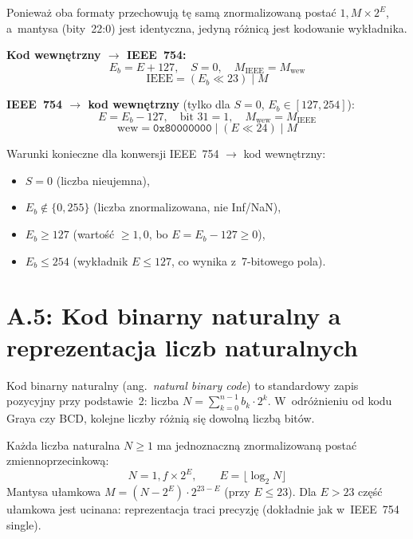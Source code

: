 \documentclass[12pt,a4paper]{article}
\begin{document}
Ponieważ oba formaty przechowują tę samą znormalizowaną postać $1{,}M \times 2^E$,
a~mantysa (bity~22:0) jest identyczna, jedyną różnicą jest kodowanie wykładnika.

\medskip
\noindent\textbf{Kod wewnętrzny $\to$ IEEE~754:}
\[
  E_b = E + 127, \quad S = 0, \quad M_{\text{IEEE}} = M_{\text{wew}}
\]
\[
  \text{IEEE} = (E_b \ll 23) \mid M
\]

\noindent\textbf{IEEE~754 $\to$ kod wewnętrzny} (tylko dla $S=0$, $E_b \in [127, 254]$):
\[
  E = E_b - 127, \quad \text{bit~31} = 1, \quad M_{\text{wew}} = M_{\text{IEEE}}
\]
\[
  \text{wew} = \texttt{0x80000000} \mid (E \ll 24) \mid M
\]

Warunki konieczne dla konwersji IEEE~754 $\to$ kod wewnętrzny:
\begin{itemize}
  \item $S = 0$ (liczba nieujemna),
  \item $E_b \notin \{0, 255\}$ (liczba znormalizowana, nie Inf/NaN),
  \item $E_b \geq 127$ (wartość $\geq 1{,}0$, bo $E = E_b - 127 \geq 0$),
  \item $E_b \leq 254$ (wykładnik $E \leq 127$, co wynika z~7-bitowego pola).
\end{itemize}

\section*{A.5: Kod binarny naturalny a reprezentacja liczb naturalnych}

Kod binarny naturalny (ang.\ \textit{natural binary code}) to standardowy
zapis pozycyjny przy podstawie~2: liczba $N = \sum_{k=0}^{n-1} b_k \cdot 2^k$.
W~odróżnieniu od kodu Graya czy BCD, kolejne liczby różnią się dowolną liczbą bitów.

Każda liczba naturalna $N \geq 1$ ma jednoznaczną znormalizowaną postać
zmiennoprzecinkową:
\[
  N = 1{,}f \times 2^E, \qquad E = \lfloor \log_2 N \rfloor
\]
Mantysa ułamkowa $M = (N - 2^E) \cdot 2^{23-E}$ (przy $E \leq 23$).
Dla $E > 23$ część ułamkowa jest ucinana: reprezentacja traci precyzję
(dokładnie jak w~IEEE~754 single).
\end{document}
